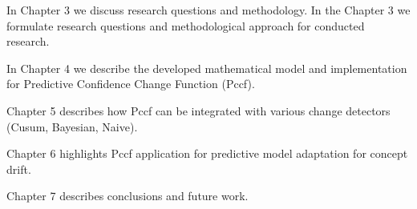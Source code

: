 In Chapter 3 we discuss research questions and methodology.
In the Chapter 3 we formulate research questions and methodological approach for conducted research. 

In Chapter 4 we describe the developed mathematical model and implementation for Predictive Confidence Change Function (Pccf).

Chapter 5 describes how Pccf can be integrated with various change detectors (Cusum, Bayesian, Naive). 

Chapter 6 highlights Pccf application for predictive model adaptation for concept drift. 

Chapter 7 describes conclusions and future work.
